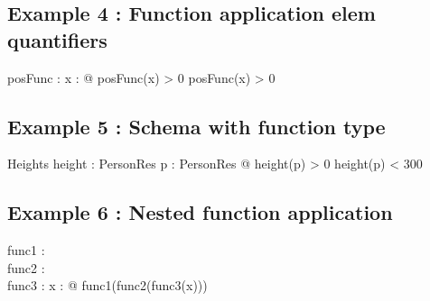 \documentclass[a4paper,10pt,fleqn]{article}
\begin{document}
\subsection*{Example 4 : Function application elem quantifiers}

\begin{axdef}
posFunc : \nat \fun \nat
\where
\forall x : \nat @ posFunc(x) > 0 \implies posFunc(x) > 0
\end{axdef}

\subsection*{Example 5 : Schema with function type}

\begin{schema}{Heights}
height : PersonRes \fun \nat
\where
\forall p : PersonRes @ height(p) > 0 \land height(p) < 300
\end{schema}

\subsection*{Example 6 : Nested function application}

\begin{axdef}
func1 : \nat \fun \nat \\
func2 : \nat \fun \nat \\
func3 : \nat \fun \nat
\where
\forall x : \nat @ func1(func2(func3(x))) 
\end{axdef}
\end{document}
